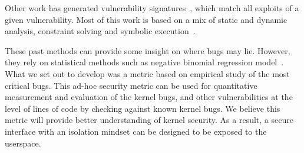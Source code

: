 Other work has generated vulnerability
signatures~\cite{brumley2006towards}, which match all exploits
of a given vulnerability. Most of this work is based on a mix of static and
dynamic analysis, constraint solving and symbolic execution~\cite{chou2003static}.

These past methods can provide some insight on where bugs may lie.
However, they rely on statistical methods such as
negative binomial regression model~\cite{Bug-Location}. What we set out to
develop was a metric based on empirical study of
the most critical bugs. This ad-hoc security metric can be used for
quantitative measurement and evaluation of the kernel bugs,
and other vulnerabilities at the level of lines of code by checking against
known kernel bugs.
We believe this metric will provide better understanding of kernel security.
As a result, a secure interface with an isolation mindset can be designed
to be exposed to the userspace.





